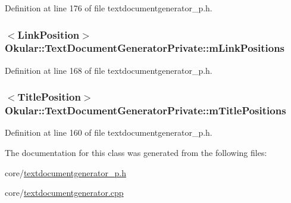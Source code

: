 Definition at line 176 of file textdocumentgenerator\+\_\+p.\+h.

\hypertarget{classOkular_1_1TextDocumentGeneratorPrivate_a84d3854584bfdb3c5151bb6bb049cbba}{
\subsubsection[{m\+Link\+Positions}]{$<${\bf Link\+Position}$>$ Okular\+::\+Text\+Document\+Generator\+Private\+::m\+Link\+Positions}}\label{classOkular_1_1TextDocumentGeneratorPrivate_a84d3854584bfdb3c5151bb6bb049cbba}


Definition at line 168 of file textdocumentgenerator\+\_\+p.\+h.

\hypertarget{classOkular_1_1TextDocumentGeneratorPrivate_a2facb58407e1b46e1e534956d1b1d46d}{
\subsubsection[{m\+Title\+Positions}]{$<${\bf Title\+Position}$>$ Okular\+::\+Text\+Document\+Generator\+Private\+::m\+Title\+Positions}}\label{classOkular_1_1TextDocumentGeneratorPrivate_a2facb58407e1b46e1e534956d1b1d46d}


Definition at line 160 of file textdocumentgenerator\+\_\+p.\+h.



The documentation for this class was generated from the following files\+:\begin{DoxyCompactItemize}
\item 
core/\hyperlink{textdocumentgenerator__p_8h}{textdocumentgenerator\+\_\+p.\+h}\item 
core/\hyperlink{textdocumentgenerator_8cpp}{textdocumentgenerator.\+cpp}\end{DoxyCompactItemize}

